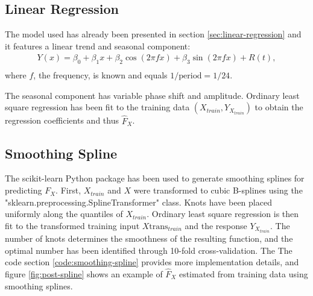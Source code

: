 \subsection{Linear Regression}

The model used has already been presented in section \ref{sec:linear-regression} and
it features a linear trend and seasonal component:
\begin{gather*}
Y(x) = \beta_0 + \beta_1 x + \beta_2 \cos(2 \pi f x) + \beta_3 \sin(2 \pi f x) + R(t), \\
\end{gather*}
where $f$, the frequency, is known and equals $1/\text{period} = 1/24$.

The seasonal component has variable phase shift and amplitude.
Ordinary least square regression has been fit to the training data
$(X_{train}, Y_{X_{train}})$ to obtain the regression coefficients and thus
$\hat{F}_X$.
%

\subsection{Smoothing Spline}
The scikit-learn Python package has been used to
generate smoothing splines for predicting $F_X$.
First, $X_{train}$ and $X$ were transformed to cubic B-splines using the \\
"sklearn.preprocessing.SplineTransformer" class.
Knots have been placed uniformly along the quantiles of $X_{train}$.
Ordinary least square regression is then fit to the transformed training
input $X\text{trans}_{train}$ and the response $Y_{X_{train}}$.
The number of knots determines the smoothness of the resulting function,
and the optimal number has been identified through 10-fold
cross-validation. The
%
The code section \ref{code:smoothing-spline} provides more implementation details,
and figure \ref{fig:post-spline} shows an example of $\hat{F}_X$ estimated
from training data using smoothing splines.

